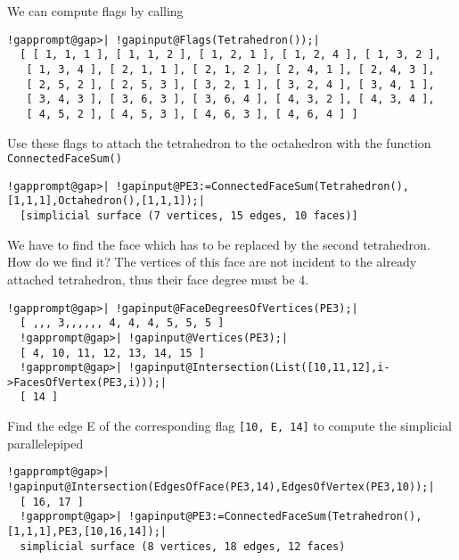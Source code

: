 \documentclass[a4paper,11pt]{report}
\begin{document}
{{{ We can compute flags by calling 
\begin{Verbatim}[commandchars=!@|,fontsize=\small,frame=single,label=Example]
  !gapprompt@gap>| !gapinput@Flags(Tetrahedron());|
  [ [ 1, 1, 1 ], [ 1, 1, 2 ], [ 1, 2, 1 ], [ 1, 2, 4 ], [ 1, 3, 2 ], 
   [ 1, 3, 4 ], [ 2, 1, 1 ], [ 2, 1, 2 ], [ 2, 4, 1 ], [ 2, 4, 3 ], 
   [ 2, 5, 2 ], [ 2, 5, 3 ], [ 3, 2, 1 ], [ 3, 2, 4 ], [ 3, 4, 1 ], 
   [ 3, 4, 3 ], [ 3, 6, 3 ], [ 3, 6, 4 ], [ 4, 3, 2 ], [ 4, 3, 4 ], 
   [ 4, 5, 2 ], [ 4, 5, 3 ], [ 4, 6, 3 ], [ 4, 6, 4 ] ]
\end{Verbatim}
 

 Use these flags to attach the tetrahedron to the octahedron with the function \texttt{ConnectedFaceSum()} 

 
\begin{Verbatim}[commandchars=!@|,fontsize=\small,frame=single,label=Example]
  !gapprompt@gap>| !gapinput@PE3:=ConnectedFaceSum(Tetrahedron(),[1,1,1],Octahedron(),[1,1,1]);|
  [simplicial surface (7 vertices, 15 edges, 10 faces)]
\end{Verbatim}
 

 
\begin{center}

\end{center}
 

 We have to find the face which has to be replaced by the second tetrahedron.
How do we find it? The vertices of this face are not incident to the already
attached tetrahedron, thus their face degree must be 4. 

 
\begin{Verbatim}[commandchars=!@|,fontsize=\small,frame=single,label=Example]
  !gapprompt@gap>| !gapinput@FaceDegreesOfVertices(PE3);|
  [ ,,, 3,,,,,, 4, 4, 4, 5, 5, 5 ]
  !gapprompt@gap>| !gapinput@Vertices(PE3);|
  [ 4, 10, 11, 12, 13, 14, 15 ]
  !gapprompt@gap>| !gapinput@Intersection(List([10,11,12],i->FacesOfVertex(PE3,i)));|
  [ 14 ]
\end{Verbatim}
 

 Find the edge E of the corresponding flag \texttt{[10, E, 14]} to compute the simplicial parallelepiped 

 
\begin{Verbatim}[commandchars=!@|,fontsize=\small,frame=single,label=Example]
  !gapprompt@gap>| !gapinput@Intersection(EdgesOfFace(PE3,14),EdgesOfVertex(PE3,10));|
  [ 16, 17 ]
  !gapprompt@gap>| !gapinput@PE3:=ConnectedFaceSum(Tetrahedron(),[1,1,1],PE3,[10,16,14]);|
  simplicial surface (8 vertices, 18 edges, 12 faces)
\end{Verbatim}
 

}}}
\end{document}
